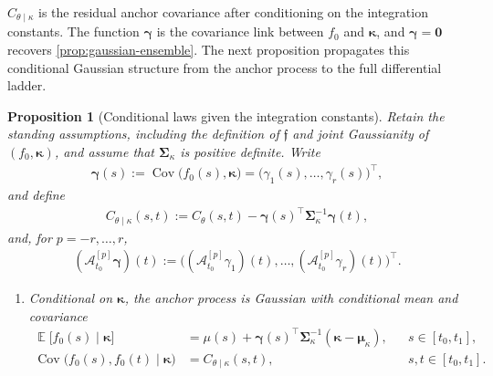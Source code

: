 \documentclass[11pt,a4paper]{article}
\newtheorem{proposition}{Proposition}
\theoremstyle{definition}
\theoremstyle{remark}
\DeclareMathOperator{\E}{\mathbb{E}}
\DeclareMathOperator{\Cov}{Cov}
\begin{document}
\(C_{\theta\mid\kappa}\) is the residual anchor covariance after conditioning on the integration constants. The function \(\boldsymbol{\gamma}\) is the covariance link between \(f_0\) and \(\boldsymbol{\kappa}\), and \(\boldsymbol{\gamma}=\mathbf{0}\) recovers \cref{prop:gaussian-ensemble}. The next proposition propagates this conditional Gaussian structure from the anchor process to the full differential ladder.



\begin{proposition}[Conditional laws given the integration constants]\label{prop:appendix-conditional-laws}
Retain the standing assumptions, including the definition of \(\mathfrak f\) and joint Gaussianity of \((f_0,\boldsymbol{\kappa})\), and assume that \(\boldsymbol{\Sigma}_{\kappa}\) is positive definite. Write
\begin{align*}
\boldsymbol{\gamma}(s):=\Cov\bigl(f_0(s),\boldsymbol{\kappa}\bigr)=\bigl(\gamma_1(s),\ldots,\gamma_r(s)\bigr)^\top,
\end{align*}
and define
\begin{align*}
C_{\theta\mid\kappa}(s,t):=C_\theta(s,t)-\boldsymbol{\gamma}(s)^\top\boldsymbol{\Sigma}_{\kappa}^{-1}\boldsymbol{\gamma}(t),
\end{align*}
and, for \(p=-r,\ldots,r\),
\begin{align*}
(\mathcal A_{t_0}^{[p]}\boldsymbol{\gamma})(t):=\bigl((\mathcal A_{t_0}^{[p]}\gamma_1)(t),\ldots,(\mathcal A_{t_0}^{[p]}\gamma_r)(t)\bigr)^\top.
\end{align*}

\begin{enumerate}
\item Conditional on \(\boldsymbol{\kappa}\), the anchor process is Gaussian with conditional mean and covariance
\begin{align*}
\E\bigl[f_0(s)\mid \boldsymbol{\kappa}\bigr]
&=\mu(s)+\boldsymbol{\gamma}(s)^\top\boldsymbol{\Sigma}_{\kappa}^{-1}(\boldsymbol{\kappa}-\boldsymbol{\mu}_{\kappa}), && s\in[t_0,t_1],\\
\Cov\bigl(f_0(s),f_0(t)\mid \boldsymbol{\kappa}\bigr)
&=C_{\theta\mid\kappa}(s,t), && s,t\in[t_0,t_1].
\end{align*}


\end{enumerate}
\end{proposition}
\end{document}
